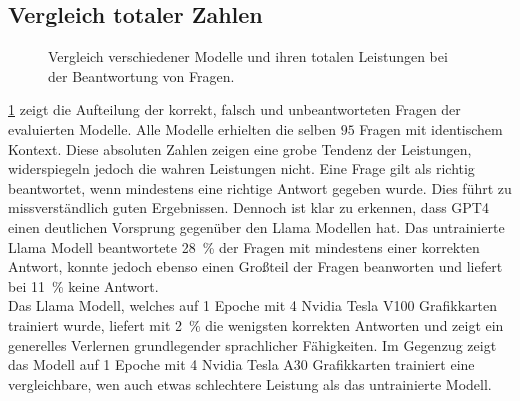 \subsection{Vergleich totaler Zahlen}
\begin{figure}
    \caption{Vergleich verschiedener Modelle und ihren totalen Leistungen bei der Beantwortung von Fragen.}
    \label{fig:results:answers_total}
\end{figure}
\cref{fig:results:answers_total} zeigt die Aufteilung der korrekt, falsch und unbeantworteten Fragen der evaluierten Modelle.
Alle Modelle erhielten die selben $95$ Fragen mit identischem Kontext. Diese absoluten Zahlen zeigen eine grobe Tendenz der Leistungen, widerspiegeln jedoch die wahren Leistungen nicht.
Eine Frage gilt als richtig beantwortet, wenn mindestens eine richtige Antwort gegeben wurde. Dies führt zu missverständlich guten Ergebnissen.
Dennoch ist klar zu erkennen, dass GPT4 einen deutlichen Vorsprung gegenüber den Llama Modellen hat.
Das untrainierte Llama Modell beantwortete \SI{28}{\percent} der Fragen mit mindestens einer korrekten Antwort, konnte jedoch ebenso einen Großteil der Fragen beanworten und liefert bei \SI{11}{\percent} keine Antwort.\\

Das Llama Modell, welches auf 1 Epoche mit 4 Nvidia Tesla V100 Grafikkarten trainiert wurde, liefert mit \SI{2}{\percent} die wenigsten korrekten Antworten und zeigt ein generelles Verlernen grundlegender sprachlicher Fähigkeiten.
Im Gegenzug zeigt das Modell auf 1 Epoche mit 4 Nvidia Tesla A30 Grafikkarten trainiert eine vergleichbare, wen auch etwas schlechtere Leistung als das untrainierte Modell.\\

